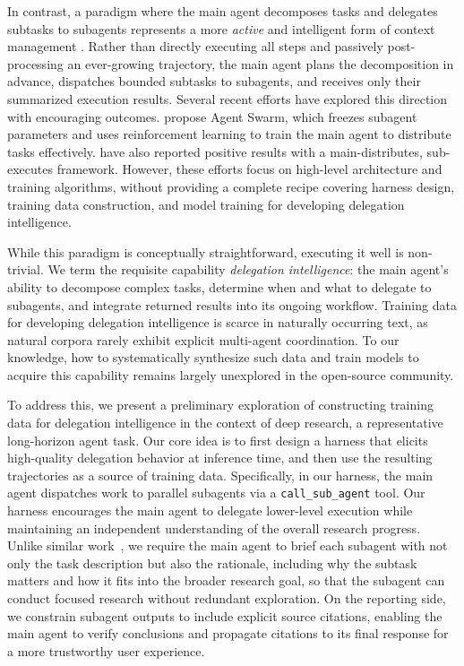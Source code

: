 \documentclass[table]{gtech}
\begin{document}
In contrast, a paradigm where the main agent decomposes tasks and delegates subtasks to subagents represents a more \emph{active} and intelligent form of context management \citep{anthropic2025multiagent}. Rather than directly executing all steps and passively post-processing an ever-growing trajectory, the main agent plans the decomposition in advance, dispatches bounded subtasks to subagents, and receives only their summarized execution results. Several recent efforts have explored this direction with encouraging outcomes. \citet{team2026kimi} propose Agent Swarm, which freezes subagent parameters and uses reinforcement learning to train the main agent to distribute tasks effectively. \citet{huang2026step} have also reported positive results with a main-distributes, sub-executes framework. However, these efforts focus on high-level architecture and training algorithms, without providing a complete recipe covering harness design, training data construction, and model training for developing delegation intelligence.

While this paradigm is conceptually straightforward, executing it well is non-trivial. We term the requisite capability \emph{delegation intelligence}: the main agent's ability to decompose complex tasks, determine when and what to delegate to subagents, and integrate returned results into its ongoing workflow. Training data for developing delegation intelligence is scarce in naturally occurring text, as natural corpora rarely exhibit explicit multi-agent coordination. To our knowledge, how to systematically synthesize such data and train models to acquire this capability remains largely unexplored in the open-source community.

To address this, we present a preliminary exploration of constructing training data for delegation intelligence in the context of deep research, a representative long-horizon agent task. Our core idea is to first design a harness that elicits high-quality delegation behavior at inference time, and then use the resulting trajectories as a source of training data. Specifically, in our harness, the main agent dispatches work to parallel subagents via a \texttt{call\_sub\_agent} tool. Our harness encourages the main agent to delegate lower-level execution while maintaining an independent understanding of the overall research progress. Unlike similar work~\citep{huang2026wideseek, xu2026wideseek}, we require the main agent to brief each subagent with not only the task description but also the rationale, including why the subtask matters and how it fits into the broader research goal, so that the subagent can conduct focused research without redundant exploration. On the reporting side, we constrain subagent outputs to include explicit source citations, enabling the main agent to verify conclusions and propagate citations to its final response for a more trustworthy user experience.
\end{document}
